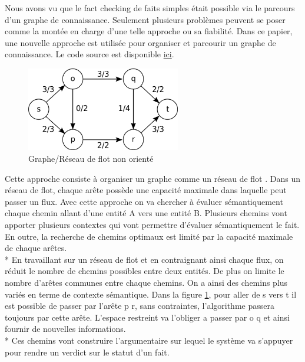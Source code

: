
Nous avons vu que le fact checking de faits simples était possible via le parcours d'un graphe de connaissance. Seulement plusieurs problèmes peuvent se poser comme la montée en charge d'une telle approche ou sa fiabilité. Dans ce papier, une nouvelle approche est utilisée pour organiser et parcourir un graphe de connaissance. Le code source est disponible \href{https://github.com/shiralkarprashant/knowledgestream}{ici}.

\begin{figure}
  \begin{center}
    \includegraphics[width=0.6\textwidth]{imgs/max_flow.png}
  \end{center}
  \caption{Graphe/Réseau de flot non orienté}
  \label{max_flow}
\end{figure}

Cette approche consiste à organiser un graphe comme un réseau de flot \cite{shiralkar2017finding}. Dans un réseau de flot, chaque arête possède une capacité maximale dans laquelle peut passer un flux. Avec cette approche on va chercher à évaluer sémantiquement chaque chemin allant d'une entité A vers une entité B. Plusieurs chemins vont apporter plusieurs contextes qui vont permettre d'évaluer sémantiquement le fait. En outre, la recherche de chemins optimaux est limité par la capacité maximale de chaque arêtes. 
\\*
En travaillant sur un réseau de flot et en contraignant ainsi chaque flux, on réduit le nombre de chemins possibles entre deux entités. De plus on limite le nombre d'arêtes communes entre chaque chemins. On a ainsi des chemins plus variés en terme de contexte sémantique. Dans la figure \ref{max_flow}, pour aller de s vers t il est possible de passer par l'arête p \textrightarrow r, sans contraintes, l'algorithme passera toujours par cette arête. L'espace restreint va l'obliger a passer par o \textrightarrow q et ainsi fournir de nouvelles informations.
\\*
Ces chemins vont construire l'argumentaire sur lequel le système va s'appuyer pour rendre un verdict sur le statut d'un fait.

